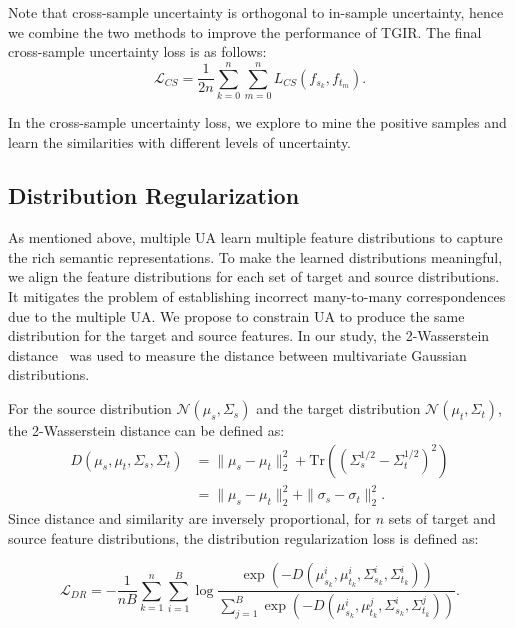 \documentclass[letterpaper]{article} \usepackage{aaai24}  \usepackage{times}  \usepackage{helvet}  \usepackage{courier}  \usepackage[hyphens]{url}  \usepackage{graphicx} \urlstyle{rm} \def\UrlFont{\rm}  \usepackage{natbib}  \usepackage{caption} \frenchspacing  \setlength{\pdfpagewidth}{8.5in} \setlength{\pdfpageheight}{11in} \usepackage{amsmath,amsfonts}
\begin{document}
Note that cross-sample uncertainty is orthogonal to in-sample uncertainty, hence we combine the two methods to improve the performance of TGIR. The final cross-sample uncertainty loss is as follows:
\begin{equation}
    \mathcal{L}_{CS} = \frac{1}{2n}\sum_{k=0}^n\sum_{m=0}^nL_{CS}(f_{s_k} , f_{t_m}).
\end{equation}

In the cross-sample uncertainty loss, we explore to mine the positive samples and learn the similarities with different levels of uncertainty.  

\subsection{Distribution Regularization}
As mentioned above, multiple UA learn multiple feature distributions to capture the rich semantic representations. To make the learned distributions meaningful, we align the feature distributions for each set of target and source distributions. It mitigates the problem of establishing incorrect many-to-many correspondences due to the multiple UA. We propose to  constrain UA to produce the same distribution for the target and source features. In our study, the 2-Wasserstein distance~\cite{Gulrajani2017wgan,Kim21vilt} was used to measure the distance between multivariate Gaussian distributions. 

For the source distribution $\mathcal{N}(\mu_s, \Sigma_s)$ and the target distribution $\mathcal{N}(\mu_t,\Sigma_t)$, the 2-Wasserstein distance can be defined as:
\begin{equation}
    \begin{aligned}
        D(\mu_s, \mu_t, \Sigma_{s}, \Sigma_{t}) &=\|\mu_s-\mu_t\|_{2}^{2}+\mathrm{Tr}((\Sigma_{s}^{1/2}-\Sigma_{t}^{1/2})^{2}) \\
        &=\|\mu_s-\mu_t\|_{2}^{2}+\|\sigma_{s}-\sigma_{t}\|_{2}^{2}.
    \end{aligned}
\end{equation}
Since distance and similarity are inversely proportional, for $n$ sets of target and source feature distributions, the distribution regularization loss is defined as:

\begin{equation}
    \mathcal{L}_{DR} = -\frac{1}{nB}\sum_{k=1}^n\sum_{i=1}^B\log\frac{\exp\left(-D(\mu_{s_k}^i, \mu_{t_k}^i, \Sigma_{s_k}^i, \Sigma_{t_k}^i) \right)}{\sum_{j=1}^B\exp\left(-D(\mu_{s_k}^i, \mu_{t_k}^j, \Sigma_{s_k}^i, \Sigma_{t_k}^j)\right)}.
\end{equation}
\end{document}
